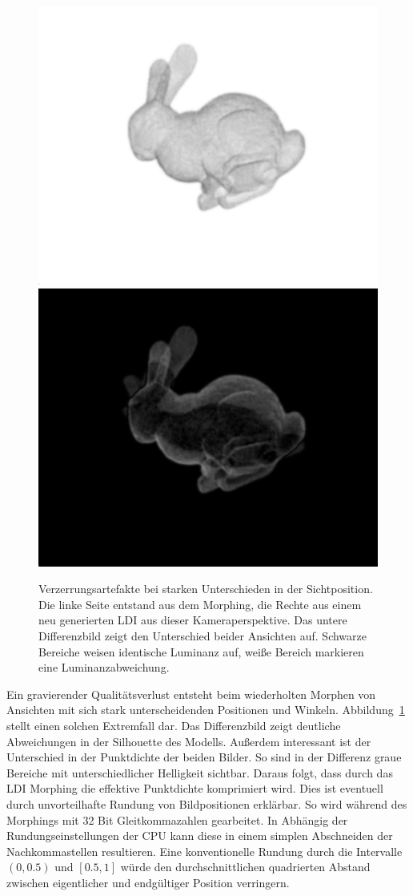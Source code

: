 \documentclass[hyperref, beleg, german]{cgvpub}
\begin{document}
\begin{figure}
	\includegraphics[width = .48\linewidth]{images/distortion/241_filtered}
	\includegraphics[width = .48\linewidth]{images/distortion/diff}
	\caption{Verzerrungsartefakte bei starken Unterschieden in der Sichtposition.
	Die linke Seite entstand aus dem Morphing, die Rechte aus einem neu 
	generierten LDI aus dieser Kameraperspektive. Das untere Differenzbild zeigt
	den Unterschied beider Ansichten auf. Schwarze Bereiche weisen identische 
	Luminanz auf, weiße Bereich markieren eine Luminanzabweichung.}%
	\label{img:distortion}
\end{figure}

Ein gravierender Qualitätsverlust entsteht beim wiederholten Morphen von
Ansichten mit sich stark unterscheidenden Positionen und Winkeln.
Abbildung~\ref{img:distortion} stellt einen solchen Extremfall dar. Das
Differenzbild zeigt deutliche Abweichungen in der Silhouette des Modells.
Außerdem interessant ist der Unterschied in der Punktdichte der beiden Bilder.
So sind in der Differenz graue Bereiche mit unterschiedlicher Helligkeit
sichtbar. Daraus folgt, dass durch das LDI Morphing die effektive Punktdichte
komprimiert wird. Dies ist eventuell durch unvorteilhafte Rundung von
Bildpositionen erklärbar. So wird während des Morphings mit 32 Bit
Gleitkommazahlen gearbeitet. In Abhängig der Rundungseinstellungen der CPU kann
diese in einem simplen Abschneiden der Nachkommastellen resultieren. Eine
konventionelle Rundung durch die Intervalle \( \left(0, 0.5\right) \) und \(
\left[0.5, 1\right] \) würde den durchschnittlichen quadrierten Abstand
zwischen eigentlicher und endgültiger Position verringern.
\end{document}
